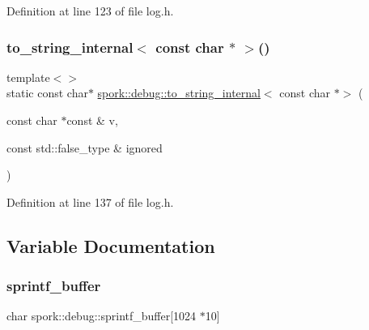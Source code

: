 Definition at line 123 of file log.\+h.

\mbox{\label{namespacespork_1_1debug_a32859632cb378334e7808f5daf380ed8}} 
\subsubsection{\texorpdfstring{to\+\_\+string\+\_\+internal$<$ const char $\ast$ $>$()}{to\_string\_internal< const char * >()}}
{\footnotesize\ttfamily template$<$$>$ \\
static const char$\ast$ \hyperlink{namespacespork_1_1debug_a8fd0aebbc584e9053a2e81ad7f207c14}{spork\+::debug\+::to\+\_\+string\+\_\+internal}$<$ const char $\ast$$>$ (\begin{DoxyParamCaption}\item[{const char $\ast$const \&}]{v,  }\item[{const std\+::false\+\_\+type \&}]{ignored }\end{DoxyParamCaption})\hspace{0.3cm}{\ttfamily [static]}}



Definition at line 137 of file log.\+h.



\subsection{Variable Documentation}
\mbox{\label{namespacespork_1_1debug_ad495c6327f1d571e7db4d5698410ca7d}} 
\subsubsection{\texorpdfstring{sprintf\+\_\+buffer}{sprintf\_buffer}}
{\footnotesize\ttfamily char spork\+::debug\+::sprintf\+\_\+buffer\mbox{[}1024 $\ast$10\mbox{]}\hspace{0.3cm}{\ttfamily [static]}}



